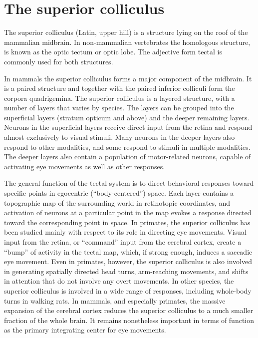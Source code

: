 \hypertarget{the-superior-colliculus}{%
\section{The superior colliculus}\label{the-superior-colliculus}}

The superior colliculus (Latin, upper hill) is a structure lying on the roof of the mammalian midbrain. In non-mammalian vertebrates the homologous structure, is known as the optic tectum or optic lobe. The adjective form tectal is commonly used for both structures.

In mammals the superior colliculus forms a major component of the midbrain. It is a paired structure and together with the paired inferior colliculi form the corpora quadrigemina. The superior colliculus is a layered structure, with a number of layers that varies by species. The layers can be grouped into the superficial layers (stratum opticum and above) and the deeper remaining layers. Neurons in the superficial layers receive direct input from the retina and respond almost exclusively to visual stimuli. Many neurons in the deeper layers also respond to other modalities, and some respond to stimuli in multiple modalities. The deeper layers also contain a population of motor-related neurons, capable of activating eye movements as well as other responses.

The general function of the tectal system is to direct behavioral responses toward specific points in egocentric (``body-centered'') space. Each layer contains a topographic map of the surrounding world in retinotopic coordinates, and activation of neurons at a particular point in the map evokes a response directed toward the corresponding point in space. In primates, the superior colliculus has been studied mainly with respect to its role in directing eye movements. Visual input from the retina, or ``command'' input from the cerebral cortex, create a ``bump'' of activity in the tectal map, which, if strong enough, induces a saccadic eye movement. Even in primates, however, the superior colliculus is also involved in generating spatially directed head turns, arm-reaching movements, and shifts in attention that do not involve any overt movements. In other species, the superior colliculus is involved in a wide range of responses, including whole-body turns in walking rats. In mammals, and especially primates, the massive expansion of the cerebral cortex reduces the superior colliculus to a much smaller fraction of the whole brain. It remains nonetheless important in terms of function as the primary integrating center for eye movements.

